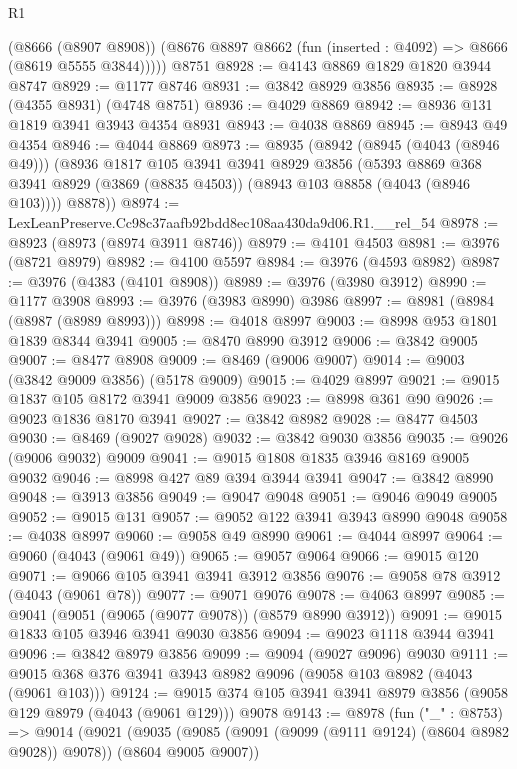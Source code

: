 \begin{lexlean}{R1}
\begin{coremodule}
        (@8666 (@8907 @8908))
        (@8676 @8897 @8662 (fun (inserted : @4092) => @8666 (@8619 @5555 @3844)))))
    @8751
@8928 := @4143 @8869 @1829 @1820 @3944 @8747
@8929 := @1177 @8746
@8931 := @3842 @8929 @3856
@8935 := @8928 (@4355 @8931) (@4748 @8751)
@8936 := @4029 @8869
@8942 := @8936 @131 @1819 @3941 @3943 @4354 @8931
@8943 := @4038 @8869
@8945 := @8943 @49 @4354
@8946 := @4044 @8869
@8973 := @8935
    (@8942
      (@8945 (@4043 (@8946 @49)))
      (@8936
        @1817
        @105
        @3941
        @3941
        @8929
        @3856
        (@5393 @8869 @368 @3941 @8929 (@3869 (@8835 @4503)) (@8943 @103 @8858 (@4043 (@8946 @103))))
        @8878))
@8974 := LexLeanPreserve.Cc98c37aafb92bdd8ec108aa430da9d06.R1.__rel_54
@8978 := @8923 (@8973 (@8974 @3911 @8746))
@8979 := @4101 @4503
@8981 := @3976 (@8721 @8979)
@8982 := @4100 @5597
@8984 := @3976 (@4593 @8982)
@8987 := @3976 (@4383 (@4101 @8908))
@8989 := @3976 (@3980 @3912)
@8990 := @1177 @3908
@8993 := @3976 (@3983 @8990) @3986
@8997 := @8981 (@8984 (@8987 (@8989 @8993)))
@8998 := @4018 @8997
@9003 := @8998 @953 @1801 @1839 @8344 @3941
@9005 := @8470 @8990 @3912
@9006 := @3842 @9005
@9007 := @8477 @8908
@9009 := @8469 (@9006 @9007)
@9014 := @9003 (@3842 @9009 @3856) (@5178 @9009)
@9015 := @4029 @8997
@9021 := @9015 @1837 @105 @8172 @3941 @9009 @3856
@9023 := @8998 @361 @90
@9026 := @9023 @1836 @8170 @3941
@9027 := @3842 @8982
@9028 := @8477 @4503
@9030 := @8469 (@9027 @9028)
@9032 := @3842 @9030 @3856
@9035 := @9026 (@9006 @9032) @9009
@9041 := @9015 @1808 @1835 @3946 @8169 @9005 @9032
@9046 := @8998 @427 @89 @394 @3944 @3941
@9047 := @3842 @8990
@9048 := @3913 @3856
@9049 := @9047 @9048
@9051 := @9046 @9049 @9005
@9052 := @9015 @131
@9057 := @9052 @122 @3941 @3943 @8990 @9048
@9058 := @4038 @8997
@9060 := @9058 @49 @8990
@9061 := @4044 @8997
@9064 := @9060 (@4043 (@9061 @49))
@9065 := @9057 @9064
@9066 := @9015 @120
@9071 := @9066 @105 @3941 @3941 @3912 @3856
@9076 := @9058 @78 @3912 (@4043 (@9061 @78))
@9077 := @9071 @9076
@9078 := @4063 @8997
@9085 := @9041 (@9051 (@9065 (@9077 @9078)) (@8579 @8990 @3912))
@9091 := @9015 @1833 @105 @3946 @3941 @9030 @3856
@9094 := @9023 @1118 @3944 @3941
@9096 := @3842 @8979 @3856
@9099 := @9094 (@9027 @9096) @9030
@9111 := @9015 @368 @376 @3941 @3943 @8982 @9096 (@9058 @103 @8982 (@4043 (@9061 @103)))
@9124 := @9015 @374 @105 @3941 @3941 @8979 @3856 (@9058 @129 @8979 (@4043 (@9061 @129))) @9078
@9143 := @8978
    (fun ("_" : @8753) =>
    @9014
      (@9021
        (@9035 (@9085 (@9091 (@9099 (@9111 @9124) (@8604 @8982 @9028)) @9078)) (@8604 @9005 @9007))

\end{coremodule}
\end{lexlean}
